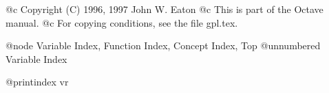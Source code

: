 @c Copyright (C) 1996, 1997 John W. Eaton
@c This is part of the Octave manual.
@c For copying conditions, see the file gpl.tex.

@node Variable Index, Function Index, Concept Index, Top
@unnumbered Variable Index

@printindex vr
